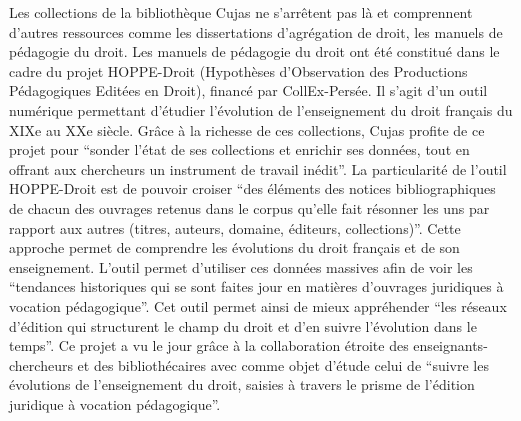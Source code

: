 Les collections de la bibliothèque Cujas ne s'arrêtent pas là et comprennent d'autres ressources comme les dissertations d'agrégation de droit, les manuels de pédagogie du droit. Les manuels de pédagogie du droit ont été constitué dans le cadre du projet HOPPE-Droit (Hypothèses d'Observation des Productions Pédagogiques Editées en Droit), financé par CollEx-Persée. Il s'agit d'un outil numérique permettant d'étudier l'évolution de l'enseignement du droit français du XIXe au XXe siècle. Grâce à la richesse de ces collections, Cujas profite de ce projet pour \enquote{sonder l'état de ses collections et enrichir ses données, tout en offrant aux chercheurs un instrument de travail inédit}. La particularité de l'outil HOPPE-Droit est de pouvoir croiser \enquote{des éléments des notices bibliographiques de chacun des ouvrages retenus dans le corpus qu'elle fait résonner les uns par rapport aux autres (titres, auteurs, domaine, éditeurs, collections)}. Cette approche permet de comprendre les évolutions du droit français et de son enseignement. L'outil permet d'utiliser ces données massives afin de voir les \enquote{tendances historiques qui se sont faites jour en matières d'ouvrages juridiques à vocation pédagogique}. Cet outil permet ainsi de mieux appréhender \enquote{les réseaux d'édition qui structurent le champ du droit et d'en suivre l'évolution dans le temps}. Ce projet a vu le jour grâce à la collaboration étroite des enseignants-chercheurs et des bibliothécaires avec comme objet d'étude celui de \enquote{suivre les évolutions de l'enseignement du droit, saisies à travers le prisme de l'édition juridique à vocation pédagogique}. 
	
